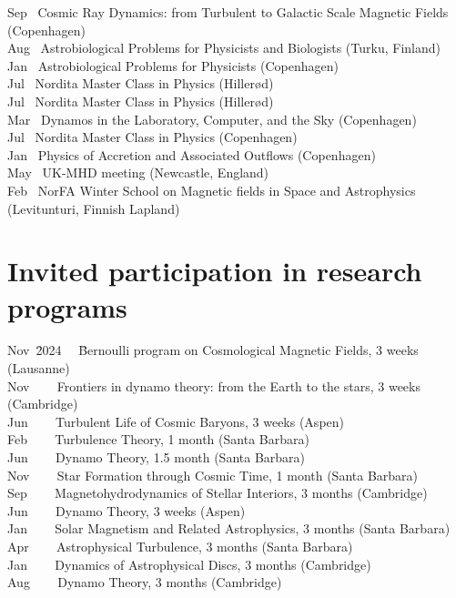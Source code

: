 \documentclass{article}
\begin{document}
\begin{tabbing}
Sep~   \> Cosmic Ray Dynamics: from Turbulent to Galactic Scale Magnetic Fields (Copenhagen)\\
Aug~   \> Astrobiological Problems for Physicists and Biologists (Turku, Finland)\\
Jan~   \> Astrobiological Problems for Physicists (Copenhagen)\\
Jul~   \> Nordita Master Class in Physics (Hiller\o d)\\
Jul~   \> Nordita Master Class in Physics (Hiller\o d)\\
Mar~   \> Dynamos in the Laboratory, Computer, and the Sky (Copenhagen)\\
Jul~   \> Nordita Master Class in Physics (Copenhagen)\\
Jan~   \> Physics of Accretion and Associated Outflows (Copenhagen)\\
May~   \> UK-MHD meeting (Newcastle, England)\\
Feb~   \> NorFA Winter School on Magnetic fields in Space and Astrophysics (Levitunturi, Finnish Lapland)\\
\end{tabbing}
\vspace{-8mm}
 
\section*{Invited participation in research programs}

\begin{tabbing}
Nov~\= 2024 ~~\= Bernoulli program on Cosmological Magnetic Fields, 3 weeks (Lausanne) \\
Nov~ ~~\> Frontiers in dynamo theory: from the Earth to the stars, 3 weeks (Cambridge) \\
Jun~ ~~\> Turbulent Life of Cosmic Baryons, 3 weeks (Aspen) \\
Feb~ ~~\> Turbulence Theory, 1 month (Santa Barbara) \\
Jun~ ~~\> Dynamo Theory, 1.5 month (Santa Barbara) \\
Nov~ ~~\> Star Formation through Cosmic Time, 1 month (Santa Barbara) \\
Sep~ ~~\> Magnetohydrodynamics of Stellar Interiors, 3 months (Cambridge) \\
Jun~ ~~\> Dynamo Theory, 3 weeks (Aspen) \\
Jan~ ~~\> Solar Magnetism and Related Astrophysics, 3 months (Santa Barbara) \\
Apr~ ~~\> Astrophysical Turbulence, 3 months (Santa Barbara) \\
Jan~ ~~\> Dynamics of Astrophysical Discs, 3 months (Cambridge) \\
Aug~ ~~\> Dynamo Theory, 3 months (Cambridge) \\
\end{tabbing}
\vspace{-8mm}
\end{document}
